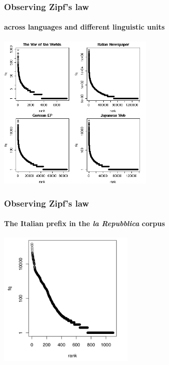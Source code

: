 \documentclass[t]{beamer} %
\begin{document}
\begin{frame}
  \frametitle{Observing Zipf's law}
  \framesubtitle{across languages and different linguistic units}

  \ungap[1.5]
  \begin{center}
    \includegraphics[height=7.5cm]{img/othercorporarf}
  \end{center}
\end{frame}

\begin{frame}
  \frametitle{Observing Zipf's law}
  \framesubtitle{The Italian prefix  in the \emph{la Repubblica} corpus}

  \begin{center}
    \includegraphics[height=6.5cm]{img/ita-ri-rf}
  \end{center}
\end{frame}
\end{document}
